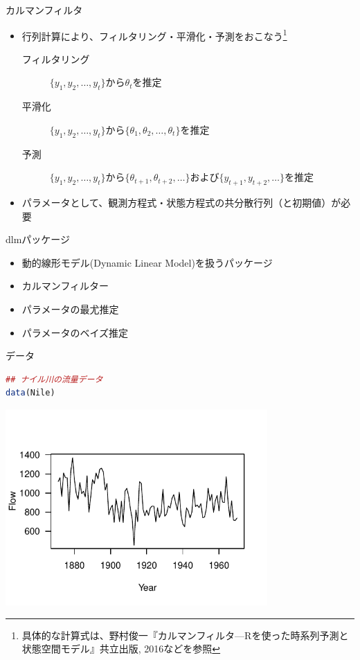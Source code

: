\documentclass[dvipdfmx,12pt]{beamer}
\begin{document}
\begin{frame}{カルマンフィルタ}
  \begin{itemize}
  \item 行列計算により、フィルタリング・平滑化・予測をおこなう\footnote{具体的な計算式は、野村俊一『カルマンフィルタ---Rを使った時系列予測と状態空間モデル』共立出版, 2016などを参照}
     \begin{description}
     \item[フィルタリング] $\{y_1,y_2,\dots,y_t\}$から$\theta_t$を推定
     \item[平滑化] $\{y_1,y_2,\dots,y_t\}$から$\{\theta_1,\theta_2,\dots,\theta_t\}$を推定
     \item[予測] $\{y_1,y_2,\dots,y_t\}$から$\{\theta_{t+1},\theta_{t+2},\dots\}$および$\{y_{t+1},y_{t+2},\dots\}$を推定
     \end{description}
  \item パラメータとして、観測方程式・状態方程式の共分散行列（と初期値）が必要
  \end{itemize}
\end{frame}

\begin{frame}{dlmパッケージ}
  \begin{itemize}
  \item 動的線形モデル(Dynamic Linear Model)を扱うパッケージ
  \item カルマンフィルター
  \item パラメータの最尤推定
  \item パラメータのベイズ推定
  \end{itemize}
\end{frame}

\begin{frame}[fragile]{データ}
  \begin{lstlisting}[language=R]
## ナイル川の流量データ
data(Nile)
  \end{lstlisting}

  \begin{center}
    \includegraphics[width=10cm]{Nile}
  \end{center}
\end{frame}
\end{document}
